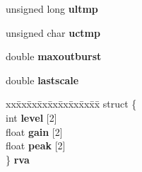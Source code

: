 \begin{DoxyCompactItemize}
unsigned long {\bfseries ultmp}
\item 
\mbox{\label{structmpg123__handle__struct_ae6fce762b62f75672587eb1aec39ced8}} 
unsigned char {\bfseries uctmp}
\item 
\mbox{\label{structmpg123__handle__struct_ab0e22c82aac7d58172ca0205c86d44e5}} 
double {\bfseries maxoutburst}
\item 
\mbox{\label{structmpg123__handle__struct_a87096f92136362667c86be8b3230f00b}} 
double {\bfseries lastscale}
\item 
\mbox{\label{structmpg123__handle__struct_a642e313dbfc9e107e70334090a1a1835}} 
\begin{tabbing}
xx\=xx\=xx\=xx\=xx\=xx\=xx\=xx\=xx\=\kill
struct \{\\
\>int {\bfseries level} \mbox{[}2\mbox{]}\\
\>float {\bfseries gain} \mbox{[}2\mbox{]}\\
\>float {\bfseries peak} \mbox{[}2\mbox{]}\\
\} {\bfseries rva}\\


\end{tabbing}
\end{DoxyCompactItemize}
